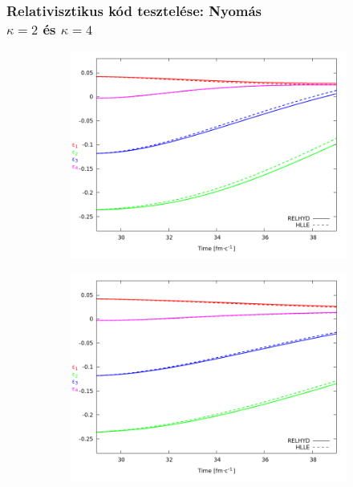 \documentclass{beamer}
\begin{document}
\begin{frame}
\frametitle{Relativisztikus kód tesztelése: Nyomás \\ $\kappa=2$ és $\kappa=4$}
\begin{center}
\begin{figure}[H]
	\centering
    \begin{subfigure}[b]{0.49\textwidth}
    		\includegraphics[width=\textwidth]{pic/res/hr_p_kappa=2}
	\end{subfigure}
	\begin{subfigure}[b]{0.49\textwidth}
        	\includegraphics[width=\textwidth]{pic/res/hr_p_kappa=4}
	\end{subfigure}
\end{figure}
\end{center}
\end{frame}
\end{document}
